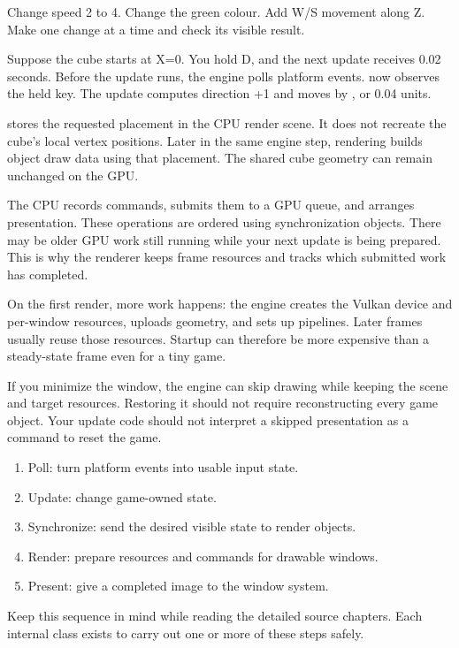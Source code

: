 \documentclass[11pt,a4paper]{article}
\begin{document}
\begin{tryit}Change speed 2 to 4. Change the green colour. Add W/S movement along Z. Make one change at a time and check its visible result.\end{tryit}

Suppose the cube starts at X=0. You hold D, and the next update receives 0.02 seconds. Before the update runs, the engine polls platform events.  now observes the held key. The update computes direction +1 and moves by , or 0.04 units.

 stores the requested placement in the CPU render scene. It does not recreate the cube's local vertex positions. Later in the same engine step, rendering builds object draw data using that placement. The shared cube geometry can remain unchanged on the GPU.

The CPU records commands, submits them to a GPU queue, and arranges presentation. These operations are ordered using synchronization objects. There may be older GPU work still running while your next update is being prepared. This is why the renderer keeps frame resources and tracks which submitted work has completed.

On the first render, more work happens: the engine creates the Vulkan device and per-window resources, uploads geometry, and sets up pipelines. Later frames usually reuse those resources. Startup can therefore be more expensive than a steady-state frame even for a tiny game.

If you minimize the window, the engine can skip drawing while keeping the scene and target resources. Restoring it should not require reconstructing every game object. Your update code should not interpret a skipped presentation as a command to reset the game.

\begin{enumerate}
\item Poll: turn platform events into usable input state.
\item Update: change game-owned state.
\item Synchronize: send the desired visible state to render objects.
\item Render: prepare resources and commands for drawable windows.
\item Present: give a completed image to the window system.
\end{enumerate}
\begin{remember}Keep this sequence in mind while reading the detailed source chapters. Each internal class exists to carry out one or more of these steps safely.\end{remember}
\end{document}
